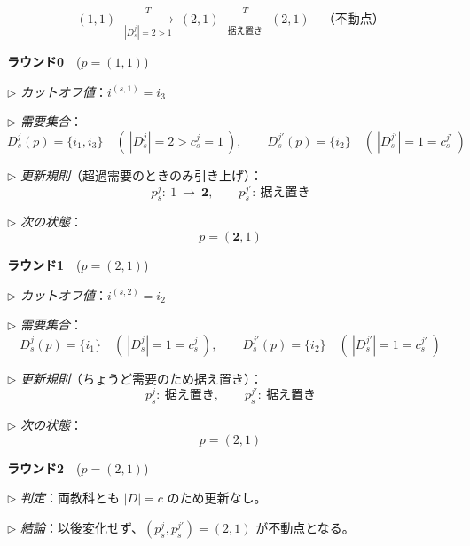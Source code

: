 \documentclass[12pt, a4paper]{article}
\theoremstyle{definition}
\theoremstyle{remark}
\theoremstyle{plain}
\begin{document}

\[
\boxed{(1,1)}
\ \xrightarrow[\ |D^j_s|=2>1\ ]{T}
\ \boxed{(2,1)}
\ \xrightarrow[\ \text{据え置き}\ ]{T}
\ \boxed{(2,1)}\quad\text{（不動点）}
\]

\noindent\textbf{ラウンド0}\ \ (\(p=(1,1)\))
\medskip

\noindent\(\triangleright\) \textit{カットオフ値}：\(i^{(s,1)}=i_3\)

\noindent\(\triangleright\) \textit{需要集合}：
\[
D^j_s(p)=\{i_1,i_3\}\quad(\ |D^j_s|=2>c^j_s=1\ ),\qquad
D^{j'}_s(p)=\{i_2\}\quad(\ |D^{j'}_s|=1=c^{j'}_s\ )
\]

\noindent\(\triangleright\) \textit{更新規則}（超過需要のときのみ引き上げ）：
\[
p^j_s:\ 1\ \to\ \mathbf{2},\qquad p^{j'}_s:\ \text{据え置き}
\]

\noindent\(\triangleright\) \textit{次の状態}：
\[
p=(\mathbf{2},1)
\]

\medskip
\noindent\textbf{ラウンド1}\ \ (\(p=(2,1)\))
\medskip

\noindent\(\triangleright\) \textit{カットオフ値}：\(i^{(s,2)}=i_2\)

\noindent\(\triangleright\) \textit{需要集合}：
\[
D^j_s(p)=\{i_1\}\quad(\ |D^j_s|=1=c^j_s\ ),\qquad
D^{j'}_s(p)=\{i_2\}\quad(\ |D^{j'}_s|=1=c^{j'}_s\ )
\]

\noindent\(\triangleright\) \textit{更新規則}（ちょうど需要のため据え置き）：
\[
p^j_s:\ \text{据え置き},\qquad p^{j'}_s:\ \text{据え置き}
\]

\noindent\(\triangleright\) \textit{次の状態}：
\[
p=(2,1)
\]

\medskip
\noindent\textbf{ラウンド2}\ \ (\(p=(2,1)\))
\medskip

\noindent\(\triangleright\) \textit{判定}：両教科とも \(|D|=c\) のため更新なし。

\noindent\(\triangleright\) \textit{結論}：以後変化せず、\(\boxed{(p^j_s,p^{j'}_s)=(2,1)}\) が不動点となる。
\end{document}
